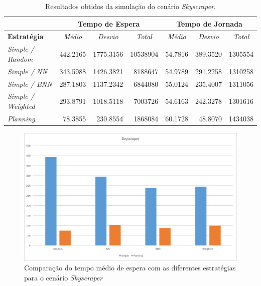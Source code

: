 \begin{table}[htb!]
\centering
\caption{Resultados obtidos da simulação do cenário \textit{Skyscraper}.}
\label{tab:results:skyscraper}
\begin{tabular}{|l|r|r|r|r|r|r|}
\hline
\multicolumn{1}{|c|}{\textbf{}}                 & \multicolumn{3}{c|}{\textbf{Tempo de Espera}}                                                                    & \multicolumn{3}{c|}{\textbf{Tempo de Jornada}}                                                                                                                       \\ \hline
\textbf{Estratégia} & \multicolumn{1}{c|}{\textit{Médio}} & \multicolumn{1}{c|}{\textit{Desvio}} & \multicolumn{1}{c|}{\textit{Total}} & \multicolumn{1}{c|}{\textit{Médio}}                   & \multicolumn{1}{c|}{\textit{Desvio}}                  & \multicolumn{1}{c|}{\textit{Total}}                  \\ \hline
\textit{Simple / Random}          & 442.2165 & 1775.3156 & 10538904 & 54.7816 & 389.3520 & 1305554 \\ \hline
\textit{Simple / NN}              & 343.5988 & 1426.3821 &  8188647 & 54.9789 & 291.2258 & 1310258 \\ \hline
\textit{Simple / BNN}             & 287.1803 & 1137.2342 &  6844080 & 55.0124 & 235.4007 & 1311056 \\ \hline
\textit{Simple / Weighted}        & 293.8791 & 1018.5118 &  7003726 & \cellcolor[HTML]{67FD9A}54.6163 & 242.3278 & \cellcolor[HTML]{67FD9A}1301616 \\ \hline
\textit{Planning}                 &  \cellcolor[HTML]{67FD9A}78.3855 &  \cellcolor[HTML]{67FD9A}230.8554 &  \cellcolor[HTML]{67FD9A}1868084 & 60.1728 &  \cellcolor[HTML]{67FD9A}48.8070 & 1434038 \\ \hline
\end{tabular}
\end{table}

\begin{figure}[htb]
  \centering
  \includegraphics[scale=0.5]{img/chart-averages-skyscraper}
  \caption{Comparação do tempo médio de espera com as diferentes estratégias
    para o cenário \textit{Skyscraper}}
  \label{fig:result:average:skyscraper}
\end{figure}